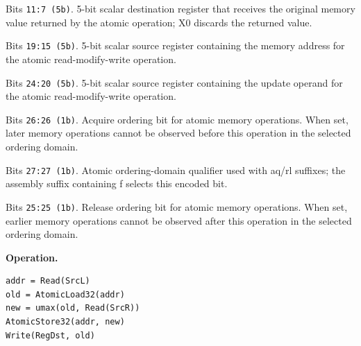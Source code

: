 \begin{description}[leftmargin=0.18\linewidth,style=nextline]
\item[\texttt{RegDst}] Bits \texttt{11:7 (5b)}. 5-bit scalar destination register that receives the original memory value returned by the atomic operation; X0 discards the returned value.
\item[\texttt{SrcL}] Bits \texttt{19:15 (5b)}. 5-bit scalar source register containing the memory address for the atomic read-modify-write operation.
\item[\texttt{SrcR}] Bits \texttt{24:20 (5b)}. 5-bit scalar source register containing the update operand for the atomic read-modify-write operation.
\item[\texttt{aq}] Bits \texttt{26:26 (1b)}. Acquire ordering bit for atomic memory operations. When set, later memory operations cannot be observed before this operation in the selected ordering domain.
\item[\texttt{far}] Bits \texttt{27:27 (1b)}. Atomic ordering-domain qualifier used with aq/rl suffixes; the assembly suffix containing f selects this encoded bit.
\item[\texttt{rl}] Bits \texttt{25:25 (1b)}. Release ordering bit for atomic memory operations. When set, earlier memory operations cannot be observed after this operation in the selected ordering domain.
\end{description}
\noindent\textbf{Operation.}\par
\begin{lstlisting}[style=ptoscalarcode]
addr = Read(SrcL)
old = AtomicLoad32(addr)
new = umax(old, Read(SrcR))
AtomicStore32(addr, new)
Write(RegDst, old)
\end{lstlisting}
\Needspace{0.08\textheight}

